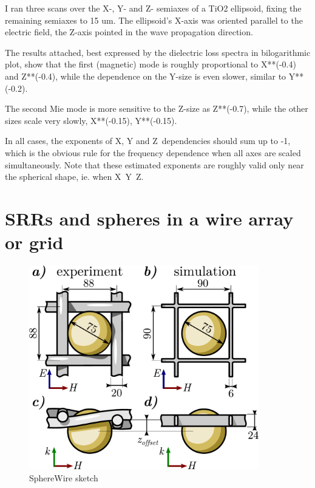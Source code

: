 I ran three scans over the X-, Y- and Z- semiaxes of a TiO2 ellipsoid, fixing the remaining semiaxes to 15 um.  The ellipsoid's X-axis was oriented parallel to the electric field, the Z-axis pointed in the wave propagation direction.

The results attached, best expressed by the dielectric loss spectra in bilogarithmic plot, show that the first (magnetic) mode is roughly proportional to X**(-0.4) and Z**(-0.4), while the dependence on the Y-size is even slower, similar to Y**(-0.2).

The second Mie mode is more sensitive to the Z-size as Z**(-0.7), while the other sizes scale very slowly, X**(-0.15), Y**(-0.15).  

In all cases, the exponents of X, Y and Z~dependencies should sum up to -1, which is the obvious rule for the frequency dependence when all axes are scaled simultaneously.
Note that these estimated exponents are roughly valid only near the
spherical shape, ie. when X~Y~Z. 






\FloatBarrier %
\section{SRRs and spheres in a wire array or grid} %
\begin{figure} \caption{SphereWire sketch}  \centering  \includegraphics[width=10cm]{img/SphereWire_sketch.pdf} \end{figure} \clearpage

